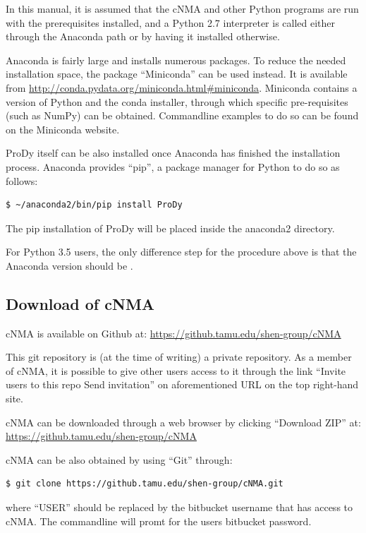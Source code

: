 \documentclass[11pt]{article}
\begin{document}
In this manual, it is assumed that the cNMA and other Python programs are run with the prerequisites installed, and a Python 2.7 interpreter is called either through the Anaconda path or by having it installed otherwise.

Anaconda is fairly large and installs numerous packages. To reduce the needed installation space, the package ``Miniconda'' can be used instead. It is available from \url{http://conda.pydata.org/miniconda.html#miniconda}. Miniconda contains a version of Python and the conda installer, through which specific pre-requisites (such as NumPy) can be obtained. 
Commandline examples to do so can be found on the Miniconda website. 

ProDy itself can be also installed once Anaconda has finished the installation process. Anaconda provides ``pip'', a package manager for Python to do so as follows:

\begin{lstlisting}
$ ~/anaconda2/bin/pip install ProDy
\end{lstlisting}

The pip installation of ProDy will be placed inside the anaconda2 directory.

For Python 3.5 users, the only difference step for the procedure above is that the Anaconda version should be .

\subsection{Download of cNMA}
cNMA is available on Github at: \url{https://github.tamu.edu/shen-group/cNMA} 

This git repository is (at the time of writing) a private repository. As a member of cNMA, it is possible to give other users access to it through the link ``Invite users to this repo Send invitation'' on aforementioned URL on the top right-hand site.

cNMA can be downloaded through a web browser by clicking ``Download ZIP'' at: \url{https://github.tamu.edu/shen-group/cNMA}

cNMA can be also obtained by using ``Git'' through:

\begin{lstlisting}
$ git clone https://github.tamu.edu/shen-group/cNMA.git
\end{lstlisting}

where ``USER'' should be replaced by the bitbucket username that has access to cNMA. The commandline will promt for the users bitbucket password.
\end{document}

